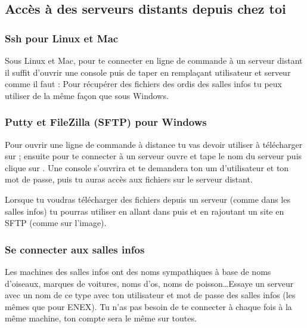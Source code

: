 \subsection{Acc\`es \`a des serveurs distants depuis chez toi}

\subsubsection{Ssh pour Linux et Mac}

Sous Linux et Mac, pour te connecter en ligne de commande à un serveur distant il suffit d'ouvrir une console puis de taper en remplaçant utilisateur et serveur comme il faut :  Pour récupérer des fichiers des ordis des salles infos tu peux utiliser  de la même façon que sous Windows.

\subsubsection{Putty et FileZilla (SFTP) pour Windows}

Pour ouvrir une ligne de commande à distance tu vas devoir utiliser  à télécharger sur  ;
ensuite pour te connecter à un serveur ouvre  et tape le nom du serveur puis clique sur .
Une console s'ouvrira et te demandera ton um d'utilisateur et ton mot de passe, puis tu auras accès aux fichiers sur le serveur distant.


Lorsque tu voudras télécharger des fichiers depuis un serveur (comme dans les salles infos) tu pourras utiliser  en allant dans  puis  et en rajoutant un site en SFTP (comme sur l'image).


\subsubsection{Se connecter aux salles infos}

Les machines des salles infos ont des noms sympathiques à base de noms d'oiseaux, marques de voitures, noms d'os, noms de poisson\dots Essaye un serveur avec un nom de ce type avec ton utilisateur et mot de passe des salles infos (les mêmes que pour ENEX). Tu n'as pas besoin de te connecter à chaque fois à la même machine, ton compte sera le même sur toutes. 

